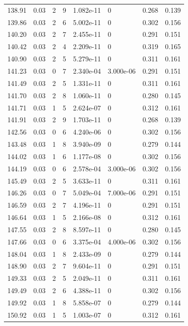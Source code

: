 \documentclass[preview]{standalone}
\begin{document}
{{{{{{\begin{tabular}{L{1.2cm}C{1.2cm} C{0.3cm}C{0.5cm} C{1.4cm}C{1.4cm} C{1.4cm}C{1.4cm}}
  138.91  &  0.03  & 2     &  9 &  1.082e-11  & 0  & 0.268 &  0.139   \\ 
  139.86  &  0.03  & 2     &  6 &  5.002e-11  & 0  & 0.302 &  0.156   \\ 
  140.20  &  0.03  & 2     &  7 &  2.455e-11  & 0  & 0.291 &  0.151   \\ 
  140.42  &  0.03  & 2     &  4 &  2.209e-11  & 0  & 0.319 &  0.165   \\ 
  140.90  &  0.03  & 2     &  5 &  5.279e-11  & 0  & 0.311 &  0.161   \\ 
  141.23  &  0.03  & 0     &  7 &  2.340e-04  & 3.000e-06  & 0.291 &  0.151   \\ 
  141.49  &  0.03  & 2     &  5 &  1.331e-11  & 0  & 0.311 &  0.161   \\ 
  141.70  &  0.03  & 2     &  8 &  1.060e-11  & 0  & 0.280 &  0.145   \\ 
  141.71  &  0.03  & 1     &  5 &  2.624e-07  & 0  & 0.312 &  0.161   \\ 
  141.91  &  0.03  & 2     &  9 &  1.703e-11  & 0  & 0.268 &  0.139   \\ 
  142.56  &  0.03  & 0     &  6 &  4.240e-06  & 0  & 0.302 &  0.156   \\ 
  143.48  &  0.03  & 1     &  8 &  3.940e-09  & 0  & 0.279 &  0.144   \\ 
  144.02  &  0.03  & 1     &  6 &  1.177e-08  & 0  & 0.302 &  0.156   \\ 
  144.19  &  0.03  & 0     &  6 &  2.578e-04  & 3.000e-06  & 0.302 &  0.156   \\ 
  145.49  &  0.03  & 2     &  5 &  3.633e-11  & 0  & 0.311 &  0.161   \\ 
  146.26  &  0.03  & 0     &  7 &  5.049e-04  & 7.000e-06  & 0.291 &  0.151   \\ 
  146.59  &  0.03  & 2     &  7 &  4.196e-11  & 0  & 0.291 &  0.151   \\ 
  146.64  &  0.03  & 1     &  5 &  2.166e-08  & 0  & 0.312 &  0.161   \\ 
  147.55  &  0.03  & 2     &  8 &  8.597e-11  & 0  & 0.280 &  0.145   \\ 
  147.66  &  0.03  & 0     &  6 &  3.375e-04  & 4.000e-06  & 0.302 &  0.156   \\ 
  148.04  &  0.03  & 1     &  8 &  2.433e-09  & 0  & 0.279 &  0.144   \\ 
  148.90  &  0.03  & 2     &  7 &  9.604e-11  & 0  & 0.291 &  0.151   \\ 
  149.33  &  0.03  & 2     &  5 &  2.049e-11  & 0  & 0.311 &  0.161   \\ 
  149.49  &  0.03  & 2     &  6 &  4.388e-11  & 0  & 0.302 &  0.156   \\ 
  149.92  &  0.03  & 1     &  8 &  5.858e-07  & 0  & 0.279 &  0.144   \\ 
  150.92  &  0.03  & 1     &  5 &  1.003e-07  & 0  & 0.312 &  0.161   \\ 
\hline 
\end{tabular} 

}}}}}}
\end{document}
